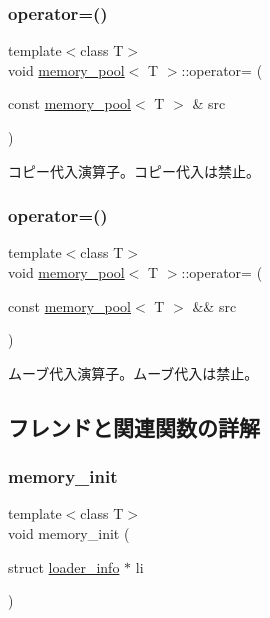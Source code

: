 \subsubsection{\texorpdfstring{operator=()}{operator=()}\hspace{0.1cm}{\footnotesize\ttfamily [1/2]}}
{\footnotesize\ttfamily template$<$class T$>$ \\
void \hyperlink{classmemory__pool}{memory\+\_\+pool}$<$ T $>$\+::operator= (\begin{DoxyParamCaption}\item[{const \hyperlink{classmemory__pool}{memory\+\_\+pool}$<$ T $>$ \&}]{src }\end{DoxyParamCaption})\hspace{0.3cm}{\ttfamily [delete]}}

コピー代入演算子。コピー代入は禁止。 \hypertarget{classmemory__pool_afbde5b0e1d4ef84d03837e5dbb8bac47}{}\label{classmemory__pool_afbde5b0e1d4ef84d03837e5dbb8bac47} 
\subsubsection{\texorpdfstring{operator=()}{operator=()}\hspace{0.1cm}{\footnotesize\ttfamily [2/2]}}
{\footnotesize\ttfamily template$<$class T$>$ \\
void \hyperlink{classmemory__pool}{memory\+\_\+pool}$<$ T $>$\+::operator= (\begin{DoxyParamCaption}\item[{const \hyperlink{classmemory__pool}{memory\+\_\+pool}$<$ T $>$ \&\&}]{src }\end{DoxyParamCaption})\hspace{0.3cm}{\ttfamily [delete]}}

ムーブ代入演算子。ムーブ代入は禁止。 

\subsection{フレンドと関連関数の詳解}
\hypertarget{classmemory__pool_a8840f01b46a3b9c43a461591a579c1bd}{}\label{classmemory__pool_a8840f01b46a3b9c43a461591a579c1bd} 
\subsubsection{\texorpdfstring{memory\+\_\+init}{memory\_init}}
{\footnotesize\ttfamily template$<$class T$>$ \\
void memory\+\_\+init (\begin{DoxyParamCaption}\item[{struct \hyperlink{structloader__info}{loader\+\_\+info} $\ast$}]{li }\end{DoxyParamCaption})\hspace{0.3cm}{\ttfamily [friend]}}

